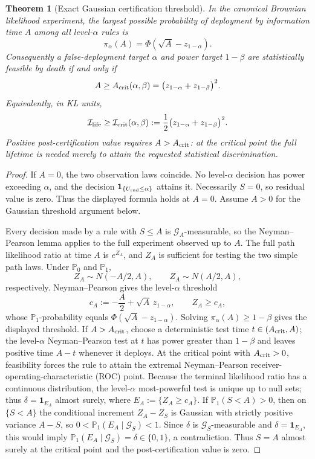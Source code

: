 \documentclass[11pt]{article}
\numberwithin{equation}{section}
\theoremstyle{plain}
\newtheorem{theorem}{Theorem}[section]
\theoremstyle{definition}
\theoremstyle{remark}
\newcommand{\Pzero}{\mathbb P_0}
\newcommand{\Pone}{\mathbb P_1}
\begin{document}
\begin{theorem}[Exact Gaussian certification threshold]\label{thm:exact-gaussian-threshold}
In the canonical Brownian likelihood experiment, the largest possible probability of deployment by information time $A$ among all level-$\alpha$ rules is
\[
\pi_\alpha(A)=\Phi\!\left(\sqrt A-z_{1-\alpha}\right).
\]
Consequently a false-deployment target $\alpha$ and power target $1-\beta$ are statistically feasible by death if and only if
\[
A\ge A_{\rm crit}(\alpha,\beta)
=\bigl(z_{1-\alpha}+z_{1-\beta}\bigr)^2.
\]
Equivalently, in KL units,
\[
\mathcal I_{\rm life}
\ge
\mathcal I_{\rm crit}(\alpha,\beta)
:=\frac12\bigl(z_{1-\alpha}+z_{1-\beta}\bigr)^2.
\]
Positive post-certification value requires $A>A_{\rm crit}$: at the critical point the full lifetime is needed merely to attain the requested statistical discrimination.
\end{theorem}

\begin{proof}
If $A=0$, the two observation laws coincide. No level-$\alpha$ decision has power exceeding $\alpha$, and the decision $\mathbf1_{\{U_{\rm rnd}\le\alpha\}}$ attains it. Necessarily $S=0$, so residual value is zero. Thus the displayed formula holds at $A=0$. Assume $A>0$ for the Gaussian threshold argument below.

Every decision made by a rule with \(S\le A\) is \(\mathcal G_A\)-measurable, so the Neyman--Pearson lemma applies to the full experiment observed up to \(A\). The full path likelihood ratio at time \(A\) is \(e^{Z_A}\), and \(Z_A\) is sufficient for testing the two simple path laws. Under \(\Pzero\) and \(\Pone\), \[
Z_A\sim N(-A/2,A),
\qquad
Z_A\sim N(A/2,A),
\] respectively. Neyman--Pearson gives the level-\(\alpha\)
threshold
\[
c_A:=-\frac A2+\sqrt A\,z_{1-\alpha},
\qquad Z_A\ge c_A,
\]
whose \(\Pone\)-probability equals \(\Phi(\sqrt A-z_{1-\alpha})\).
Solving \(\pi_\alpha(A)\ge1-\beta\) gives the displayed threshold. If
\(A>A_{\rm crit}\), choose a deterministic test time
\(t\in(A_{\rm crit},A)\); the level-\(\alpha\) Neyman--Pearson test at \(t\) has
power greater than \(1-\beta\) and leaves positive time \(A-t\) whenever
it deploys. At the critical point with $A_{\rm crit}>0$, feasibility forces the rule to attain the extremal
Neyman--Pearson receiver-operating-characteristic (ROC) point. Because the terminal likelihood ratio has a continuous
distribution, the level-\(\alpha\) most-powerful test is unique up to null sets;
thus \(\delta=\mathbf 1_{E_A}\) almost surely, where
\(E_A:=\{Z_A\ge c_A\}\). If \(\Pone(S<A)>0\), then on \(\{S<A\}\) the
conditional increment \(Z_A-Z_S\) is Gaussian with strictly positive variance
\(A-S\), so
\(0<\Pone(E_A\mid\mathcal G_S)<1\). Since \(\delta\) is
\(\mathcal G_S\)-measurable and \(\delta=\mathbf 1_{E_A}\), this would imply
\(\Pone(E_A\mid\mathcal G_S)=\delta\in\{0,1\}\), a contradiction. Thus
\(S=A\) almost surely at the critical point and the post-certification value is
zero.
\end{proof}
\end{document}
